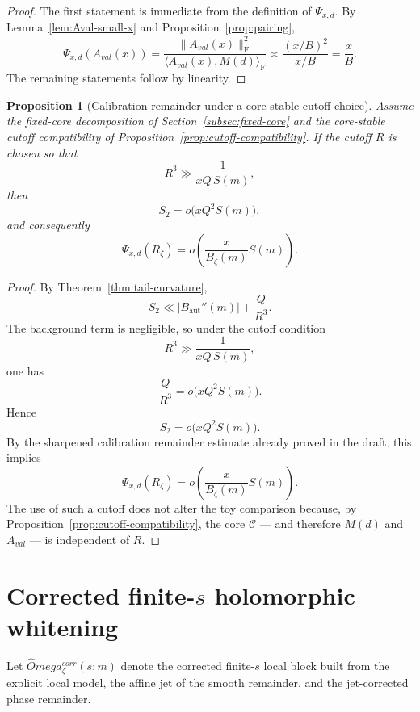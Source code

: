 \documentclass[11pt,a4paper]{amsart}
\def\Omega{Omega}%
\def\corr{corr}%
\def\val{val}%
\theoremstyle{plain}
\newtheorem{proposition}[theorem]{Proposition}
\theoremstyle{definition}
\newcommand{\Aut}{\mathrm{aut}}
\newcommand{\val}{\mathrm{val}}
\newcommand{\corr}{\mathrm{corr}}
\newcommand{\F}{\mathrm{F}}
\begin{document}
\begin{proof}
The first statement is immediate from the definition of $\Psi_{x,d}$.
By Lemma~\ref{lem:Aval-small-x} and Proposition~\ref{prop:pairing},
\[
\Psi_{x,d}(A_{\val}(x))
=
\frac{\|A_{\val}(x)\|_\F^2}{\langle A_{\val}(x),M(d)\rangle_\F}
\asymp
\frac{(x/B)^2}{x/B}
=
\frac{x}{B}.
\]
The remaining statements follow by linearity.
\end{proof}

\begin{proposition}[Calibration remainder under a core-stable cutoff choice]
\label{prop:calibration-remainder-cutoff}
Assume the fixed-core decomposition of
Section~\ref{subsec:fixed-core} and the core-stable cutoff compatibility of
Proposition~\ref{prop:cutoff-compatibility}. If the cutoff $R$ is chosen so
that
\[
R^3\gg \frac{1}{xQ\,S(m)},
\]
then
\[
S_2=o\!\bigl(xQ^2S(m)\bigr),
\]
and consequently
\[
\Psi_{x,d}(R_\zeta)=o\!\left(\frac{x}{B_\zeta(m)}S(m)\right).
\]
\end{proposition}

\begin{proof}
By Theorem~\ref{thm:tail-curvature},
\[
S_2\ll |B_{\Aut}''(m)|+\frac{Q}{R^3}.
\]
The background term is negligible, so under the cutoff condition
\[
R^3\gg \frac{1}{xQ\,S(m)},
\]
one has
\[
\frac{Q}{R^3}=o\!\bigl(xQ^2S(m)\bigr).
\]
Hence
\[
S_2=o\!\bigl(xQ^2S(m)\bigr).
\]
By the sharpened calibration remainder estimate already proved in the draft,
this implies
\[
\Psi_{x,d}(R_\zeta)=o\!\left(\frac{x}{B_\zeta(m)}S(m)\right).
\]
The use of such a cutoff does not alter the toy comparison because, by
Proposition~\ref{prop:cutoff-compatibility}, the core $\mathcal C$ --- and
therefore $M(d)$ and $A_{\val}$ --- is independent of $R$.
\end{proof}

\section{Corrected finite-\texorpdfstring{$s$}{s} holomorphic whitening}

Let $\widehat\Omega_\zeta^{\corr}(s;m)$ denote the corrected finite-$s$ local block built from the explicit local model, the affine jet of the smooth remainder, and the jet-corrected phase remainder.
\end{document}

